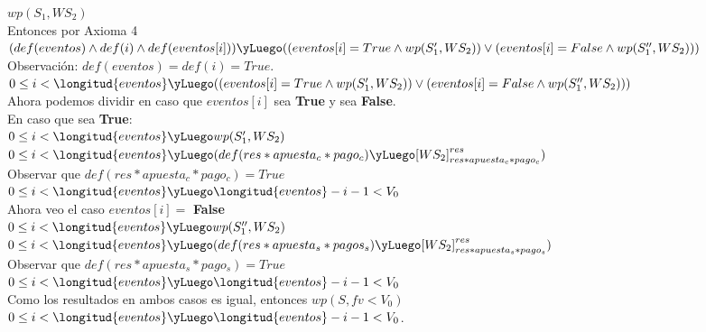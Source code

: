 \documentclass[10pt,a4paper]{article}
\begin{document}
\equiv $wp(S_1, WS_2)$
\\

Entonces por Axioma 4
\\

\equiv $(def(eventos) \land def(i) \land def(eventos[i])) \yLuego 
((eventos[i]=True \land wp(S'_1,WS_2)) \lor (eventos[i] = False \land wp(S''_1, WS_2)))$
\\

Observación: $def(eventos) = def(i) = True$.
\\

\equiv $0 \leq i < \longitud{eventos} \yLuego ((eventos[i]=True \land wp(S'_1,WS_2)) \lor (eventos[i] = False \land wp(S''_1, WS_2)))$
\\

Ahora podemos dividir en caso que $eventos[i]$ sea \textbf{True} y sea \textbf{False}.
\\

En caso que sea \textbf{True}:
\\

\equiv $0 \leq i < \longitud{eventos} \yLuego wp(S'_1, WS_2)$
\\

\equiv $0 \leq i < \longitud{eventos} \yLuego (def(res * apuesta_c * pago_c) \yLuego [WS_2]_{res * apuesta_c * pago_c}^{res})$
\\

Observar que $def(res * apuesta_c * pago_c) = True$
\\

\equiv $0 \leq i < \longitud{eventos} \yLuego \longitud{eventos} - i - 1 < V_0$
\\

Ahora veo el caso $eventos[i] = $ \textbf{False}
\\

\equiv $0 \leq i < \longitud{eventos} \yLuego wp(S''_1, WS_2)$
\\

\equiv $0 \leq i < \longitud{eventos} \yLuego (def(res * apuesta_s * pagos_s) \yLuego [WS_2]_{res * apuesta_s * pago_s}^{res})$
\\

Observar que $def(res * apuesta_s * pago_s) = True$
\\

\equiv $0 \leq i < \longitud{eventos} \yLuego \longitud{eventos} - i - 1 < V_0$
\\

Como los resultados en ambos casos es igual, entonces $wp(S, fv < V_0)$ 
\equiv $ 0 \leq i < \longitud{eventos} \yLuego \longitud{eventos} - i - 1 < V_0$. 
\\
\end{document}
